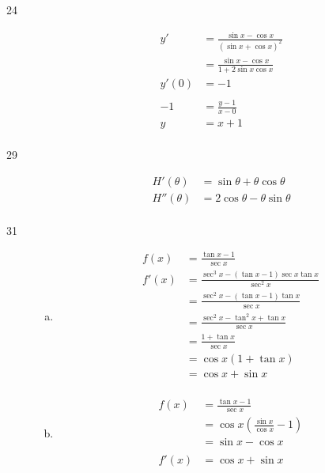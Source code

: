 \documentclass[letterpaper]{exam}
\begin{document}
\begin{description}
    \item[24] 
      \begin{align*}
        y'    & = \frac{\sin x - \cos x}{(\sin x + \cos x)^2} \\
              & = \frac{\sin x - \cos x}{1 + 2 \sin x \cos x} \\
        y'(0) & = -1 \\
         \\
        -1 & = \frac{y - 1}{x - 0} \\
        y  & = x + 1 \\
      \end{align*}

    \item[29] 
      \begin{align*}
        H'(\theta)  & = \boxed{ \sin \theta + \theta \cos \theta } \\
        H''(\theta) & = \boxed{ 2 \cos \theta - \theta \sin \theta } \\
      \end{align*}

    \item[31] 
      \begin{enumerate}[(a)]
        \item 
          \begin{align*}
            f(x)  & = \frac{\tan x - 1}{\sec x} \\
            f'(x) & = \frac{\sec^3 x - (\tan x - 1) \sec x \tan x}{\sec^2 x} \\
                  & = \frac{\sec^2 x - (\tan x - 1) \tan x}{\sec x} \\
                  & = \frac{\sec^2 x - \tan^2 x + \tan x}{\sec x} \\
                  & = \frac{1 + \tan x}{\sec x} \\
                  & = \cos x (1 + \tan x) \\
                  & = \cos x + \sin x \\
          \end{align*}

        \item
          \begin{align*}
            f(x)  & = \frac{\tan x - 1}{\sec x} \\
                  & = \cos x \left( \frac{\sin x}{\cos x} - 1 \right) \\
                  & = \sin x - \cos x \\
            \\
            f'(x) & = \cos x + \sin x \\
          \end{align*}
      \end{enumerate}


\end{description}
\end{document}
